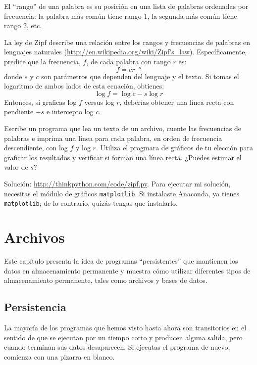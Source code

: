 \documentclass[10pt]{book}
\begin{document}
\begin{exercise}

El ``rango'' de una palabra es su posición en una lista de palabras
ordenadas por frecuencia: la palabra más común tiene rango 1, la
segunda más común tiene rango 2, etc.

La ley de Zipf describe una relación entre los rangos y frecuencias de
palabras en lenguajes naturales
(\url{http://en.wikipedia.org/wiki/Zipf's_law}).  Específicamente,
predice que la frecuencia, $f$, de cada palabra con rango $r$ es:
\[ f = c r^{-s} \]
%
donde $s$ y $c$ son parámetros que dependen del lenguaje y el
texto.  Si tomas el logaritmo de ambos lados de esta ecuación,
obtienes:
\[ \log f = \log c - s \log r \]
%
Entonces, si graficas log $f$ versus log $r$, deberías obtener
una línea recta con pendiente $-s$ e intercepto log $c$.

Escribe un programa que lea un texto de un archivo, cuente
las frecuencias de palabras e imprima una línea
para cada palabra, en orden de frecuencia descendiente, con
log $f$ y log $r$.  Utiliza el progmara de gráficos de tu
elección para graficar los resultados y verificar si forman
una línea recta.  ¿Puedes estimar el valor de $s$?

Solución: \url{http://thinkpython.com/code/zipf.py}.
Para ejecutar mi solución, necesitas el módulo de gráficos {\tt matplotlib}.
Si instalaste Anaconda, ya tienes {\tt matplotlib};
de lo contrario, quizás tengas que instalarlo.

\end{exercise}



\chapter{Archivos}

Este capítulo presenta la idea de programas ``persistentes'' que
mantienen los datos en almacenamiento permanente y muestra cómo utilizar diferentes
tipos de almacenamiento permanente, tales como archivos y bases de datos.


\section{Persistencia}

La mayoría de los programas que hemos visto hasta ahora son transitorios en el
sentido de que se ejecutan por un tiempo corto y producen alguna salida,
pero cuando terminan sus datos desaparecen.  Si ejecutas el programa
de nuevo, comienza con una pizarra en blanco.
\end{document}
